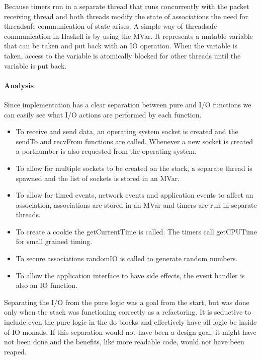 Because timers run in a separate thread that runs concurrently with the packet receiving thread and both threads modify the state of associations the need for threadsafe communication of state arises. A simple way of threadsafe communication in Haskell is by using the MVar. It represents a mutable variable that can be taken and put back with an IO operation. When the variable is taken, access to the variable is atomically blocked for other threads until the variable is put back. 

\paragraph{Analysis}
Since implementation has a clear separation between pure and I/O functions we can easily see what I/O actions are performed by each function. 

\begin{itemize}
\item To receive and send data, an operating system socket is created and the sendTo and recvFrom functions are called. Whenever a new socket is created a portnumber is also requested from the operating system.
\item To allow for multiple sockets to be created on the stack, a separate thread is spawned and the list of sockets is stored in an MVar.
\item To allow for timed events, network events and application events to affect an association, associations are stored in an MVar and timers are run in separate threads.
\item To create a cookie the getCurrentTime is called. The timers call getCPUTime for small grained timing.
\item To secure associations randomIO is called to generate random numbers.
\item To allow the application interface to have side effects, the event handler is also an IO function.
\end{itemize}


Separating the I/O from the pure logic was a goal from the start, but was done only when the stack was functioning correctly as a refactoring. It is seductive to include even the pure logic in the do blocks and effectively have all logic be inside of IO monads. If this separation would not have been a design goal, it might have not been done and the benefits, like more readable code,  would not have been reaped.

